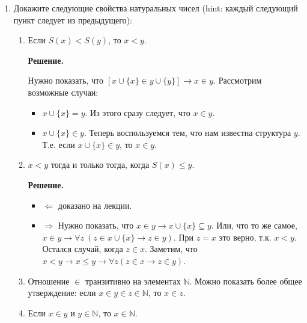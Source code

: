 \begin{enumerate}
\item Докажите следующие свойства натуральных чисел (hint: каждый следующий пункт следует из предыдущего):
\begin{enumerate}
\item Если $S(x) < S(y)$, то $x < y$.

\textbf{Решение.}

Нужно показать, что $\left[x \cup \{x\} \in y \cup \{y\}\right] \to x \in y$. Рассмотрим возможные случаи:
\begin{itemize}
	\item $x \cup \{x\} = y$. Из этого сразу следует, что $x \in y$.
	\item $x \cup \{x\} \in y$. Теперь воспользуемся тем, что нам известна структура $y$. Т.е. если $x \cup \{x\} \in 
	y$, то $x \in y$.
\end{itemize}
\item $x < y$ тогда и только тогда, когда $S(x) \leq y$.

\textbf{Решение.}
\begin{itemize}
	\item $\Leftarrow$ доказано на лекции.
	\item $\Rightarrow$ Нужно показать, что $x \in y \to x \cup \{x\} \subseteq y$. Или, что то же самое, $x \in y \to 
	\forall z \ (z \in x \cup \{x\} \to z \in y)$. При $z = x$ это верно, т.к. $x < y$. Остался случай, когда $z \in 
	x$. Заметим, что $x < y \to x \leq y \to \forall z (z \in x \to z \in y)$.
\end{itemize}

\item Отношение $\in$ транзитивно на элементах $\mathbb{N}$.
    Можно показать более общее утверждение: если $x \in y \in z \in \mathbb{N}$, то $x \in z$.
\item Если $x \in y$ и $y \in \mathbb{N}$, то $x \in \mathbb{N}$.
\end{enumerate}

\end{enumerate}
